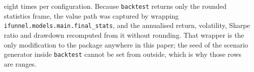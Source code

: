 \documentclass[11pt,a4paper]{article}
\newcommand{\code}[1]{\texttt{#1}}
\begin{document}
eight times per configuration. Because \code{backtest} returns only the rounded
statistics frame, the value path was captured by wrapping
\code{ifunnel.models.main.final\_stats}, and the annualised return, volatility,
Sharpe ratio and drawdown recomputed from it without rounding. That wrapper is
the only modification to the package anywhere in this paper; the seed of the
scenario generator inside \code{backtest} cannot be set from outside, which is
why those rows are ranges.



\end{document}
